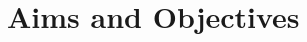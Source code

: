 \documentclass[a4paper,12pt]{report}
\begin{document}






\chapter{Aims and Objectives}
\end{document}
